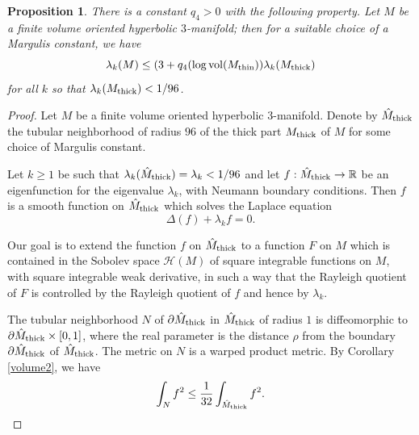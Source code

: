 \documentclass[11pt]{amsart}
\theoremstyle{plain}
\theoremstyle{plain}
\newtheorem{proposition}[theorem]{Proposition}
\theoremstyle{definition}
\newcommand{\cal}{\mathcal}
\begin{document}
\begin{proposition}\label{eigenvalue}
There is a constant $q_4>0$ with the following property.
Let $M$ be a finite volume oriented hyperbolic $3$-manifold; then for a suitable
choice of a Margulis constant, we have 
\[\lambda_k(M)\leq 
(3+q_4(\log {\rm vol}(M_{\rm thin}))\lambda_k(M_{\rm thick})\] 
for all $k$ so that $\lambda_k(M_{\rm thick})<1/96$. 
\end{proposition}
\begin{proof} 
Let $M$ be a finite volume oriented hyperbolic $3$-manifold. 
Denote by
$\hat M_{\rm thick}$ the tubular neighborhood of radius $96$ 
of the thick part
$M_{\rm thick}$ of $M$ for some choice of Margulis constant. 

Let $k\geq 1$ be such that $\lambda_k(\hat M_{\rm thick})=\lambda_k<1/96$
and let 
$f:\hat M_{\rm thick}\to \mathbb{R}$ be an eigenfunction
for the eigenvalue $\lambda_k$, with 
Neumann boundary conditions. 
Then $f$ is a smooth function on $\hat M_{\rm thick}$ 
which solves the Laplace equation 
\[\Delta(f)+
\lambda_k f=0.\] 


Our goal is to extend the function $f$ on $\hat M_{\rm thick}$ 
to a function $F$ on $M$ which is contained
in the Sobolev space ${\cal H}(M)$ of square integrable
functions on $M$, with square integrable weak derivative, in 
such a way that the Rayleigh quotient of $F$ is controlled
by the Rayleigh quotient of $f$ and hence by $\lambda_k$. 



The tubular neighborhood $N$ of 
$\partial \hat M_{\rm thick}$ in $\hat M_{\rm thick}$ of radius $1$
is diffeomorphic 
to $\partial \hat M_{\rm thick}\times [0,1]$,
where the real parameter is the distance $\rho$
from the boundary 
$\partial \hat M_{\rm thick}$ of $\hat M_{\rm thick}$.  
The metric on $N$ is a warped product metric.
By Corollary \ref{volume2}, we have
\begin{equation}\label{corollary36}
\int_Nf^2\leq \frac{1}{32}\int_{\hat M_{\rm thick}}f^2.
\end{equation}






\end{proof}
\end{document}
